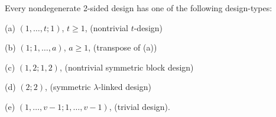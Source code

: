 Every nondegenerate 2-sided design has one of the following design-types:

(a) $(1, \ldots, t; 1)$, $t \geq 1$, (nontrivial $t$-design)

(b) $(1; 1, \ldots, a)$, $a \geq 1$, (transpose of (a))

(c) $(1, 2; 1, 2)$, (nontrivial symmetric block design)

(d) $(2; 2)$, (symmetric $\lambda$-linked design)

(e) $(1, \ldots, v - 1; 1, \ldots, v - 1)$, (trivial design).
